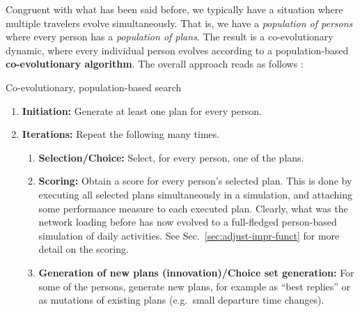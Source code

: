 Congruent with what has been said before, we typically have a
situation where multiple travelers evolve simultaneously.  That is, we
have a \emph{population of persons} where every person has a
\emph{population of plans}.  The result is a co-evolutionary dynamic,
where every individual person evolves according to a population-based
\textbf{co-evolutionary algorithm}.  The overall approach reads as
follows \citep[see, e.g.,][for a similar
  approaches]{HraberJonesForrestEcho,ArthurBar}:

\begin{algorithm}[H]

\caption{Co-evolutionary, population-based search}

\begin{enumerate}
\item \textbf{Initiation:} Generate at least one plan for every
  person.

\item \textbf{Iterations:} Repeat the following many times.

\begin{enumerate}

\item \textbf{Selection/Choice:} Select, for every person, one of the plans.

\item \textbf{Scoring:} Obtain a score for every person's selected
  plan.  This is done by executing all selected plans simultaneously
  in a simulation, and attaching some performance measure to each
  executed plan.  Clearly, what was the network loading before has now
  evolved to a full-fledged person-based simulation of daily
  activities.  See Sec.~\ref{sec:adjust-impr-funct} for more detail on
  the scoring.

\item \textbf{Generation of new plans (innovation)/Choice set
  generation:} For some of the persons, generate new plans, for
  example as ``best replies'' or as mutations of existing plans
  (e.g.\ small departure time changes).

\end{enumerate} %

\end{enumerate}

\end{algorithm}

